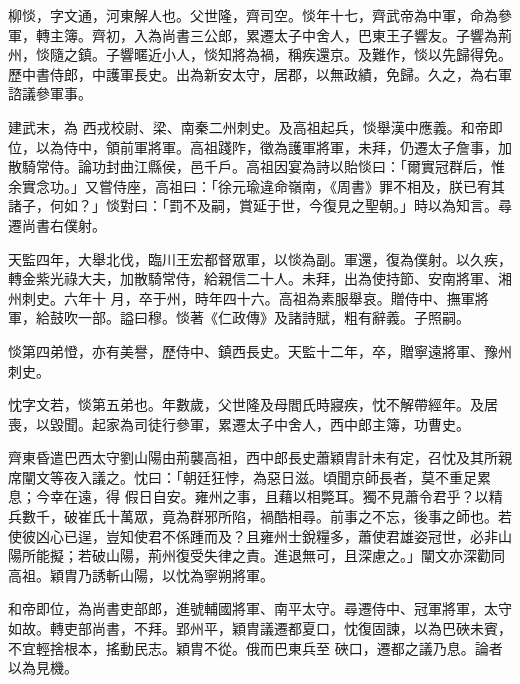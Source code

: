 
\begin{pinyinscope}

 柳惔，字文通，河東解人也。父世隆，齊司空。惔年十七，齊武帝為中軍，命為參軍，轉主簿。齊初，入為尚書三公郎，累遷太子中舍人，巴東王子響友。子響為荊州，惔隨之鎮。子響暱近小人，惔知將為禍，稱疾還京。及難作，惔以先歸得免。歷中書侍郎，中護軍長史。出為新安太守，居郡，以無政績，免歸。久之，為右軍諮議參軍事。



 建武末，為
 西戎校尉、梁、南秦二州刺史。及高祖起兵，惔舉漢中應義。和帝即位，以為侍中，領前軍將軍。高祖踐阼，徵為護軍將軍，未拜，仍遷太子詹事，加散騎常侍。論功封曲江縣侯，邑千戶。高祖因宴為詩以貽惔曰：「爾實冠群后，惟余實念功。」又嘗侍座，高祖曰：「徐元瑜違命嶺南，《周書》罪不相及，朕已宥其諸子，何如？」惔對曰：「罰不及嗣，賞延于世，今復見之聖朝。」時以為知言。尋遷尚書右僕射。



 天監四年，大舉北伐，臨川王宏都督眾軍，以惔為副。軍還，復為僕射。以久疾，轉金紫光祿大夫，加散騎常侍，給親信二十人。未拜，出為使持節、安南將軍、湘州刺史。六年十
 月，卒于州，時年四十六。高祖為素服舉哀。贈侍中、撫軍將軍，給鼓吹一部。謚曰穆。惔著《仁政傳》及諸詩賦，粗有辭義。子照嗣。



 惔第四弟憕，亦有美譽，歷侍中、鎮西長史。天監十二年，卒，贈寧遠將軍、豫州刺史。



 忱字文若，惔第五弟也。年數歲，父世隆及母閻氏時寢疾，忱不解帶經年。及居喪，以毀聞。起家為司徒行參軍，累遷太子中舍人，西中郎主簿，功曹史。



 齊東昏遣巴西太守劉山陽由荊襲高祖，西中郎長史蕭穎胄計未有定，召忱及其所親席闡文等夜入議之。忱曰：「朝廷狂悖，為惡日滋。頃聞京師長者，莫不重足累息；今幸在遠，得
 假日自安。雍州之事，且藉以相斃耳。獨不見蕭令君乎？以精兵數千，破崔氏十萬眾，竟為群邪所陷，禍酷相尋。前事之不忘，後事之師也。若使彼凶心已逞，豈知使君不係踵而及？且雍州士銳糧多，蕭使君雄姿冠世，必非山陽所能擬；若破山陽，荊州復受失律之責。進退無可，且深慮之。」闡文亦深勸同高祖。穎胄乃誘斬山陽，以忱為寧朔將軍。



 和帝即位，為尚書吏部郎，進號輔國將軍、南平太守。尋遷侍中、冠軍將軍，太守如故。轉吏部尚書，不拜。郢州平，穎胄議遷都夏口，忱復固諫，以為巴硤未賓，不宜輕捨根本，搖動民志。穎胄不從。俄而巴東兵至
 硤口，遷都之議乃息。論者以為見機。




\end{pinyinscope}
